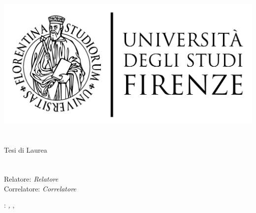 \begin{titlepage}
	\begin{center}
   	\large
      \hfill
      \vfill
      \begingroup
         \includegraphics[scale=0.15]{logo/LOGO}\\
			\myFaculty \\
			\myDegree \\ 
			\vspace{0.5cm}
         \vspace{0.5cm}    
         Tesi di Laurea    
      \endgroup 
      \vfill 
      \begingroup
      	\color{Maroon}\spacedallcaps{\myItalianTitle} \\ $\ $\\
      	\spacedallcaps{\myEnglishTitle} \\ 	
	\bigskip
      \endgroup
      \spacedlowsmallcaps{\myName}
      \vfill 
      \vfill
      Relatore: \emph{Relatore}\\
      Correlatore: \emph{Correlatore}\\
      \vfill
      \vfill
      \myTime
      \vfill                      
	\end{center}        
\end{titlepage}   
   \newpage
	\thispagestyle{empty}
	\hfill
	\vfill
	\noindent\myName: 
	\textit{\myItalianTitle,} 
	\myDegree, \textcopyright\ \myTime

